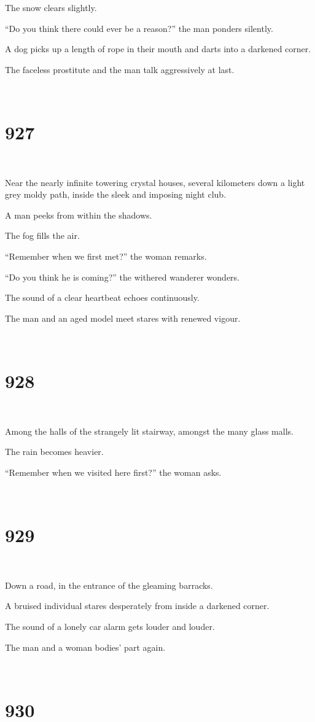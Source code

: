 \documentclass{report}
\begin{document}
The snow clears slightly.

``Do you think there could ever be a reason?'' the man ponders silently.

A dog picks up a length of rope in their mouth and darts into a darkened corner.

The faceless prostitute and the man talk aggressively at last.

~
\chapter*{927}
~

Near the nearly infinite towering crystal houses, several kilometers down a light grey moldy path, inside the sleek and imposing night club.

A man peeks from within the shadows.

The fog fills the air.

``Remember when we first met?'' the woman remarks.

``Do you think he is coming?'' the withered wanderer wonders.

The sound of a clear heartbeat echoes continuously.

The man and an aged model meet stares with renewed vigour.

~
\chapter*{928}
~

Among the halls of the strangely lit stairway, amongst the many glass malls.

The rain becomes heavier.

``Remember when we visited here first?'' the woman asks.

~
\chapter*{929}
~

Down a road, in the entrance of the gleaming barracks.

A bruised individual stares desperately from inside a darkened corner.

The sound of a lonely car alarm gets louder and louder.

The man and a woman bodies' part again.

~
\chapter*{930}
~
\end{document}
